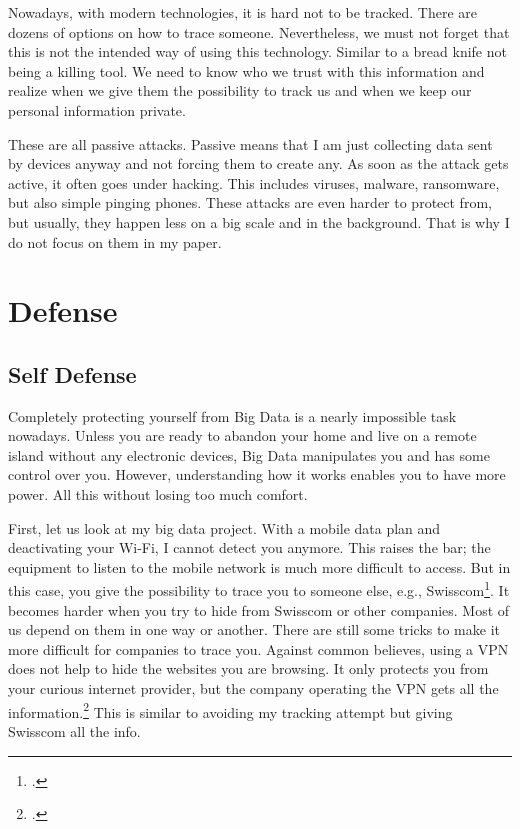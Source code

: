 \documentclass[paper=a4, fontsize=11pt]{article}
\begin{document}
Nowadays, with modern technologies, it is hard not to be tracked. There are dozens of options on how to trace someone. Nevertheless, we must not forget that this is not the intended way of using this technology. Similar to a bread knife not being a killing tool. We need to know who we trust with this information and realize when we give them the possibility to track us and when we keep our personal information private.

These are all passive attacks. Passive means that I am just collecting data sent by devices anyway and not forcing them to create any. As soon as the attack gets active, it often goes under hacking. This includes viruses, malware, ransomware, but also simple pinging phones. These attacks are even harder to protect from, but usually, they happen less on a big scale and in the background. That is why I do not focus on them in my paper.



\section{Defense}
\subsection{Self Defense}
\label{selfdefense}

Completely protecting yourself from Big Data is a nearly impossible task nowadays. Unless you are ready to abandon your home and live on a remote island without any electronic devices, Big Data manipulates you and has some control over you. However, understanding how it works enables you to have more power. All this without losing too much comfort.

First, let us look at my big data project. With a mobile data plan and deactivating your Wi-Fi, I cannot detect you anymore. This raises the bar; the equipment to listen to the mobile network is much more difficult to access. But in this case, you give the possibility to trace you to someone else, e.g., Swisscom\footcite{swisscomads}.
It becomes harder when you try to hide from Swisscom or other companies. Most of us depend on them in one way or another. There are still some tricks to make it more difficult for companies to trace you. Against common believes, using a VPN does not help to hide the websites you are browsing. It only protects you from your curious internet provider, but the company operating the VPN gets all the information.\footcite{tomscottvpn} This is similar to avoiding my tracking attempt but giving Swisscom all the info.
\end{document}
